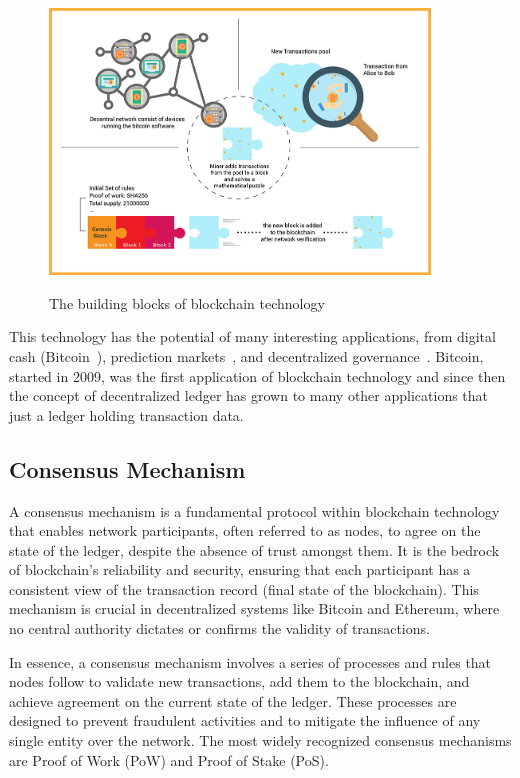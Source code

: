 \begin{figure}[h]
    \centering
    {\caption[The Building Blocks of Blockchain Technology]{The building blocks of blockchain technology}}
    {\includegraphics[width=0.9\textwidth]{figures/blockchain-buildingblocks.jpg}}
\end{figure}


This technology has the potential of many interesting applications, from digital cash (\eg Bitcoin~\cite{nakamoto2008bitcoin}), prediction markets~\cite{clark2014decentralizing}, and decentralized governance~\cite{aragonwebsite}. Bitcoin, started in 2009, was the first application of blockchain technology and since then the concept of decentralized ledger has grown to many other applications that just a ledger holding transaction data. 


\subsection{Consensus Mechanism}\label{consensus_mechanism}
A consensus mechanism is a fundamental protocol within blockchain technology that enables network participants, often referred to as nodes, to agree on the state of the ledger, despite the absence of trust amongst them. It is the bedrock of blockchain's reliability and security, ensuring that each participant has a consistent view of the transaction record (final state of the blockchain). This mechanism is crucial in decentralized systems like Bitcoin and Ethereum, where no central authority dictates or confirms the validity of transactions.

In essence, a consensus mechanism involves a series of processes and rules that nodes follow to validate new transactions, add them to the blockchain, and achieve agreement on the current state of the ledger. These processes are designed to prevent fraudulent activities and to mitigate the influence of any single entity over the network. The most widely recognized consensus mechanisms are Proof of Work (PoW) and Proof of Stake (PoS).



